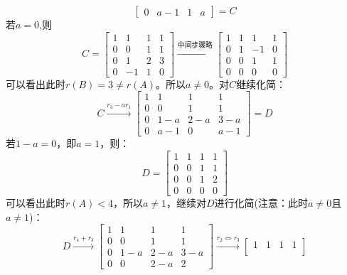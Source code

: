\documentclass{article}
\begin{document}
\begin{jie}
\begin{equation*}
{\begin{bmatrix}
   0 & a-1 & 1 & a
  \end{bmatrix}
  }=C
\end{equation*}
若$a=0$,则
\begin{equation*}
  C=
   \begin{bmatrix}
   1& 1& 1 & 1\\
   0 & 0 & 1 & 1\\
   0 & 1 & 2 & 3 \\
   0 & -1 & 1 & 0
  \end{bmatrix}
  \xrightarrow{\text{中间步骤略}}
  {
  \begin{bmatrix}
   1& 1& 1 & 1\\
   0 & 1 & -1 & 0\\
   0 & 0 & 1 & 1 \\
   0 & 0 & 0 & 0
  \end{bmatrix}
  }
\end{equation*}
可以看出此时$r(B)=3\neq r(A)$。所以\textcolor[rgb]{1.00,0.00,0.00}{$a\neq0$}。对$C$继续化简：
\begin{equation*}
  C\xrightarrow{r_{3}-ar_{1}}
  {
  \begin{bmatrix}
   1& 1& 1 & 1\\
   0 & 0 & 1 & 1\\
   0 & 1-a & 2-a & 3-a \\
   0 & a-1 & 0 & a-1
  \end{bmatrix}
  }=D
\end{equation*}
若$1-a=0$，即$a=1$，则：
\begin{equation*}
  D=\begin{bmatrix}
   1& 1& 1 & 1\\
   0 & 0 & 1 & 1\\
   0 & 0 & 1 & 2 \\
   0 & 0 & 0 & 0
  \end{bmatrix}
\end{equation*}
可以看出此时$r(A)<4$，所以\textcolor[rgb]{1.00,0.00,0.00}{$a\neq1$}，继续对$D$进行化简(注意：此时$a\neq0$且$a\neq1$)：
\begin{equation*}
D\xrightarrow{r_{4}+r_{3}}
{
     \begin{bmatrix}
   1& 1& 1 & 1\\
   0 & 0 & 1 & 1\\
   0 & 1-a & 2-a & 3-a \\
   0 & 0 & 2-a & 2
  \end{bmatrix}
}\xrightarrow{r_{2}\Leftrightarrow r_{3}}
{
 \begin{bmatrix}
   1& 1& 1 & 1\\

\end{bmatrix}}
\end{equation*}
\end{jie}
\end{document}
